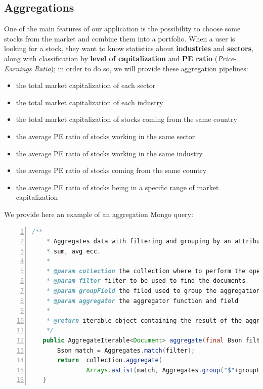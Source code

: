 \subsection{Aggregations}
One of the main features of our application is the possibility to choose some stocks from
the market and combine them into a portfolio. When a user is looking for a stock, they want to
know statistics about \textbf{industries} and \textbf{sectors}, along with classification by 
\textbf{level of capitalization} and  \textbf{PE ratio} (\textit{Price-Earnings Ratio}); in order to do so, we will provide
these aggregation pipelines:
\begin{itemize}
    \item the total market capitalization of each sector
    \item the total market capitalization of each industry
    \item the total market capitalization of stocks coming from the same country
    \item the average PE ratio of stocks working in the same sector
    \item the average PE ratio of stocks working in the same industry
    \item the average PE ratio of stocks coming from the same country
    \item the average PE ratio of stocks being in a specific range of market capitalization
\end{itemize}
We provide here an example of an aggregation Mongo query:
\begin{lstlisting}[basicstyle=\footnotesize,language=Java,numbers=left,
    numberstyle=\footnotesize,numbersep=4pt,frame=single]
    /**
    * Aggregates data with filtering and grouping by an attribute, can compute
    * sum, avg ecc.
    *
    * @param collection the collection where to perform the operation;
    * @param filter filter to be used to find the documents.
    * @param groupField the filed used to group the aggregation
    * @param aggregator the aggregator function and field
    *
    * @return iterable object containing the result of the aggregation.
    */
   public AggregateIterable<Document> aggregate(final Bson filter, final String groupField, final BsonField aggregator, final MongoCollection<Document> collection) {
       Bson match = Aggregates.match(filter);
       return  collection.aggregate(
               Arrays.asList(match, Aggregates.group("$"+groupField, aggregator)));
   }
\end{lstlisting}

